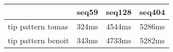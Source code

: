 \begin{tabular}{|l|c|c|c|}
\hline
 & seq59 & seq128 & seq404  \\
\hline
tip pattern tomas &  324ms &  4544ms &  5286ms\\
\hline
tip pattern benoit &  343ms &  4733ms &  5282ms\\
\hline
\end{tabular}
